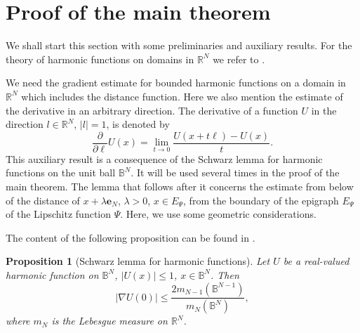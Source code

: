 \documentclass[10pt]{amsart}
\newtheorem{proposition}[theorem]{Proposition}
\theoremstyle{definition}
\numberwithin{equation}{section}
\begin{document}
\section{Proof of the  main theorem}

We shall start this section with some preliminaries and auxiliary results.       For the theory of harmonic functions on
domains in $\mathbb{R}^N$  we refer to \cite{AXLER.BOOK}.

We need the gradient estimate for bounded harmonic functions on  a domain in $\mathbb{R}^N$  which includes the distance
function.    Here we also mention the estimate of the derivative in an arbitrary direction. The derivative of a function
$U$ in the direction $l\in\mathbb{R}^N$,   $|l|=1$,  is denoted  by
\begin{equation*}
\frac{\partial}{\partial \ell}U(x) = \lim_{t\to 0} \frac{U (x+t\ell ) - U(x)}{t}.
\end{equation*}
This   auxiliary result is a consequence of the Schwarz lemma for harmonic functions on the unit ball $\mathbb{B}^N$. It
will  be used several times in the proof of the main theorem. The lemma that follows after it concerns the estimate from
below of the distance of $x+\lambda\mathbf{e}_N$, $\lambda >0$, $x\in E_\Psi$, from the boundary of the         epigraph
$E_\Psi$ of the Lipschitz function $\Psi$. Here, we use some geometric considerations.

The content of the following proposition can be found in \cite[Theorem 6.26]{AXLER.BOOK}.

\begin{proposition}[Schwarz lemma for harmonic functions]\label{PROP.SCHWARZ.HARMONIC}
Let $U$ be a real-valued harmonic function on $\mathbb {B}^N$, $ |U(x)| \le 1$, $x\in \mathbb {B}^N$. Then
\begin{equation*}\label{EQ.GRAD.0}
|\nabla U (0)| \le  \frac {2 m_{N-1}(\mathbb {B}^{N-1})}{ m_ N(\mathbb {B}^N )},
\end{equation*}
where   $m_N$  is the Lebesgue measure on $\mathbb{R}^N$.
\end{proposition}
\end{document}
